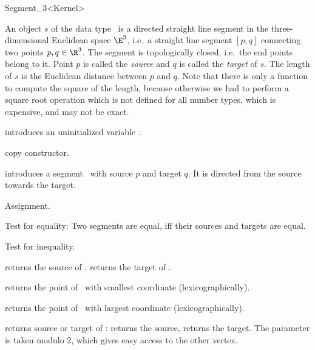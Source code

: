 \begin{ccRefClass} {Segment_3<Kernel>}


\ccDefinition  An object $s$ of the data type \ccRefName\ is a directed
straight line segment in the three-dimensional Euclidean space $\E^3$, i.e.\ a
straight line segment $[p,q]$ connecting two points $p,q \in
\R^3$. The segment is topologically closed, i.e.\  the end
points belong to it. Point $p$ is called the {\em source} and $q$
is called the {\em target} of $s$. The length of $s$ is the
Euclidean distance between $p$ and $q$. Note that there is only a function
to compute the square of the length, because otherwise we had to
perform a square root operation which is not defined for all
number types, which is expensive, and may not be exact.

\ccCreation
{}


\ccHidden {}
             {introduces an uninitialized variable \ccVar.}

\ccHidden {}
            {copy constructor.}

            {introduces a segment \ccVar\ with source $p$
             and target $q$. It is directed from the source towards
             the target.}


\ccOperations

\ccHidden {}
        {Assignment.}

       {Test for equality: Two segments are equal, iff their sources and
        targets are equal.}

       {Test for inequality.}

       {returns the source  of \ccVar.}
\ccGlue
{}
       {returns the target of \ccVar.}

       {returns the point of \ccVar\ with smallest coordinate (lexicographically).}

       {returns the point of \ccVar\ with largest coordinate (lexicographically).}

       {returns source or target of \ccVar:    returns
        the source,  returns the target. 
        The parameter  is taken modulo 2, which gives 
        easy access to the other vertex.}


\end{ccRefClass}
